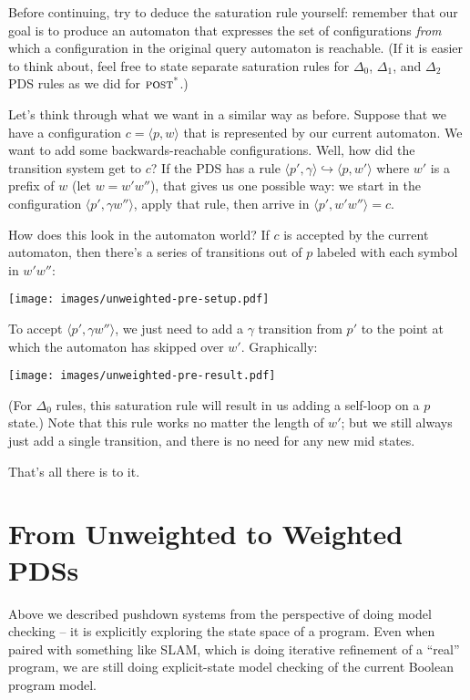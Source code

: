 \documentclass{article}
\newcommand{\Config}[2]{\ensuremath{\langle #1, #2 \rangle}}
\newcommand{\Rule}[2]{\ensuremath{#1 \hookrightarrow #2}}
\newcommand{\poststar}{\ensuremath{\textsc{post}^\textsc{*}}}
\begin{document}
Before continuing, try to deduce the saturation rule yourself:
remember that our goal is to produce an automaton that expresses the
set of configurations \emph{from} which a configuration in the
original query automaton is reachable. (If it is easier to think
about, feel free to state separate saturation rules for $\Delta_0$,
$\Delta_1$, and $\Delta_2$ PDS rules as we did for \poststar.)

Let's think through what we want in a similar way as before. Suppose
that we have a configuration $c = \Config{p}{w}$ that is represented
by our current automaton. We want to add some backwards-reachable
configurations. Well, how did the transition system get to $c$? If the
PDS has a rule \Rule{\Config{p'}{\gamma}}{\Config{p}{w'}} where $w'$
is a prefix of $w$ (let $w = w'w''$), that gives us one possible way:
we start in the configuration \Config{p'}{\gamma w''}, apply that
rule, then arrive in $\Config{p'}{w'w''} = c$.

How does this look in the automaton world? If $c$ is accepted by the
current automaton, then there's a series of transitions out of $p$
labeled with each symbol in $w'w''$:
\begin{center}
  \texttt{[image: images/unweighted-pre-setup.pdf]}
\end{center}

To accept \Config{p'}{\gamma w''}, we just need to add a $\gamma$
transition from $p'$ to the point at which the automaton has skipped
over $w'$. Graphically:
\begin{center}
  \texttt{[image: images/unweighted-pre-result.pdf]}
\end{center}

(For $\Delta_0$ rules, this saturation rule will result in us adding a
self-loop on a $p$ state.)  Note that this rule works no matter the
length of $w'$; but we still always just add a single transition, and
there is no need for any new mid states.

That's all there is to it.


\section{From Unweighted to Weighted PDSs}

Above we described pushdown systems from the perspective of doing
model checking -- it is explicitly exploring the state space of a
program. Even when paired with something like SLAM, which is doing
iterative refinement of a ``real'' program, we are still doing
explicit-state model checking of the current Boolean program model.
\end{document}
